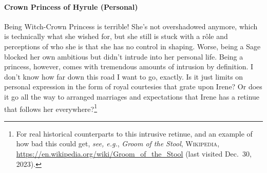   \paragraph{Crown Princess of Hyrule (Personal)}\label{sec:witchprincess} Being Witch-Crown Prin\-cess is terrible! She's not overshadowed anymore, which is technically what she wished for, but she still is stuck with a r\^ole and perceptions of who she is that she has no control in shaping. Worse, being a Sage blocked her own ambitious but didn't intrude into her personal life. Being a princess, however, comes with tremendous amounts of intrusion by definition. I don't know how far down this road I want to go, exactly. Is it just limits on personal expression in the form of royal courtesies that grate upon Irene? Or does it go all the way to arranged marriages and expectations that Irene has a retinue that follows her everywhere?\footnote{For real historical counterparts to this intrusive retinue, and an example of how bad this could get, \emph{see, e.g.}, \textit{Groom of the Stool}, \textsc{Wikipedia}, \url{https://en.wikipedia.org/wiki/Groom_of_the_Stool} (last visited Dec.~30, 2023).}

